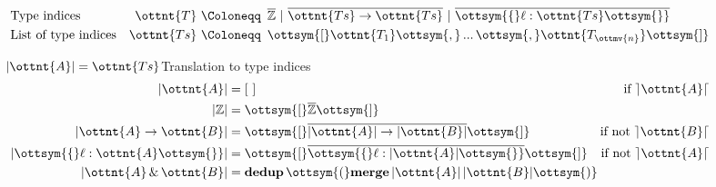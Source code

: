 \begin{figure}
  \small
  \begin{align*}
    &\text{Type indices}        &\ottnt{T} ~\Coloneqq&~\,  \overline{\mathbb{Z} }  ~|~  \overline{ \ottnt{Ts} \rightarrow \ottnt{Ts} }  ~|~  \overline{  \ottsym{\{}   \ell   :   \ottnt{Ts}   \ottsym{\}}  }  \\
    &\text{List of type indices}&\ottnt{Ts}~\Coloneqq&~\, \ottsym{[}  \ottnt{T_{{\mathrm{1}}}}  \ottsym{,} \, ... \, \ottsym{,}  \ottnt{T_{\ottmv{n}}}  \ottsym{]} \\
  \end{align*}

  \begin{minipage}{0.4\textwidth}
  \begin{rulesection}{$ | \ottnt{A} |  = \ottnt{Ts}$}{Translation to type indices}
  \begin{align*}
     | \ottnt{A} |  &=  [~]  &\text{if $ \rceil \ottnt{A} \lceil $} \\ %
     |  \mathbb{Z}  |  &= \ottsym{[}   \overline{\mathbb{Z} }   \ottsym{]} &\\
     | \ottnt{A}  \rightarrow  \ottnt{B} |  &= \ottsym{[}   \overline{  | \ottnt{A} |  \rightarrow  | \ottnt{B} |  }   \ottsym{]} &\text{if not $ \rceil \ottnt{B} \lceil $}\\%
     | \ottsym{\{}  \ell  :  \ottnt{A}  \ottsym{\}} |  &= \ottsym{[}   \overline{  \ottsym{\{}   \ell   :    | \ottnt{A} |    \ottsym{\}}  }   \ottsym{]} &\text{if not $ \rceil \ottnt{A} \lceil $}\\ %
     | \ottnt{A}  \, {\&} \,  \ottnt{B} |  &= \textbf{dedup} \, \ottsym{(}  \textbf{merge} \,  | \ottnt{A} |  \,  | \ottnt{B} |   \ottsym{)} \hspace*{-1cm}&
  \end{align*}
  \end{rulesection}
  \end{minipage}
  \hfill
  \begin{minipage}{0.5\textwidth}

\end{minipage}
\end{figure}
